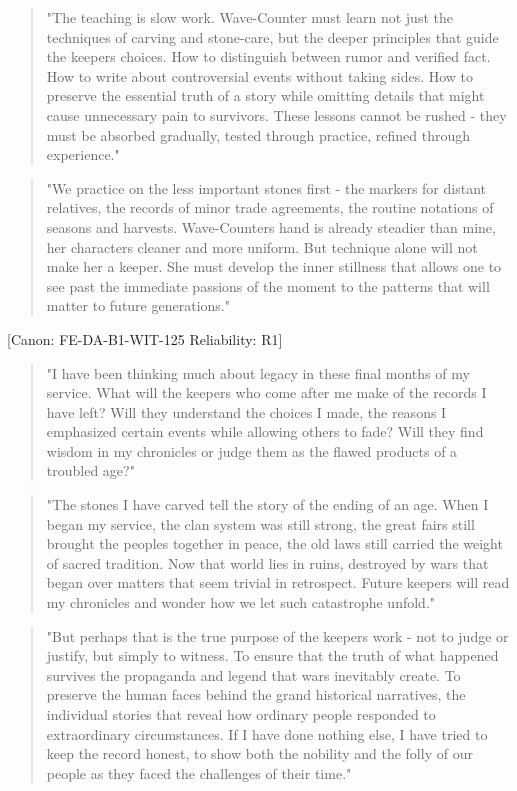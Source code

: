 \begin{quote}
"The teaching is slow work. Wave-Counter must learn not just the
techniques of carving and stone-care, but the deeper principles that
guide the keeper\textquotesingle s choices. How to distinguish between
rumor and verified fact. How to write about controversial events without
taking sides. How to preserve the essential truth of a story while
omitting details that might cause unnecessary pain to survivors. These
lessons cannot be rushed - they must be absorbed gradually, tested
through practice, refined through experience."
\end{quote}

\begin{quote}
"We practice on the less important stones first - the markers for
distant relatives, the records of minor trade agreements, the routine
notations of seasons and harvests. Wave-Counter\textquotesingle s hand
is already steadier than mine, her characters cleaner and more uniform.
But technique alone will not make her a keeper. She must develop the
inner stillness that allows one to see past the immediate passions of
the moment to the patterns that will matter to future generations."
\end{quote}

{[}Canon: FE-DA-B1-WIT-125 \textbar{} Reliability: R1{]}

\begin{quote}
"I have been thinking much about legacy in these final months of my
service. What will the keepers who come after me make of the records I
have left? Will they understand the choices I made, the reasons I
emphasized certain events while allowing others to fade? Will they find
wisdom in my chronicles or judge them as the flawed products of a
troubled age?"
\end{quote}

\begin{quote}
"The stones I have carved tell the story of the ending of an age. When I
began my service, the clan system was still strong, the great fairs
still brought the peoples together in peace, the old laws still carried
the weight of sacred tradition. Now that world lies in ruins, destroyed
by wars that began over matters that seem trivial in retrospect. Future
keepers will read my chronicles and wonder how we let such catastrophe
unfold."
\end{quote}

\begin{quote}
"But perhaps that is the true purpose of the keeper\textquotesingle s
work - not to judge or justify, but simply to witness. To ensure that
the truth of what happened survives the propaganda and legend that wars
inevitably create. To preserve the human faces behind the grand
historical narratives, the individual stories that reveal how ordinary
people responded to extraordinary circumstances. If I have done nothing
else, I have tried to keep the record honest, to show both the nobility
and the folly of our people as they faced the challenges of their time."
\end{quote}

